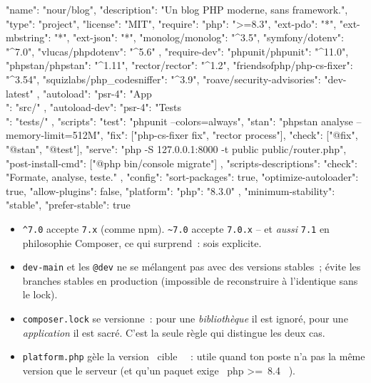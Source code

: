 \begin{codejson}
{
  "name": "nour/blog",
  "description": "Un blog PHP moderne, sans framework.",
  "type": "project",
  "license": "MIT",
  "require": {
    "php": ">=8.3",
    "ext-pdo": "*",
    "ext-mbstring": "*",
    "ext-json": "*",
    "monolog/monolog": "^3.5",
    "symfony/dotenv": "^7.0",
    "vlucas/phpdotenv": "^5.6"
  },
  "require-dev": {
    "phpunit/phpunit": "^11.0",
    "phpstan/phpstan": "^1.11",
    "rector/rector": "^1.2",
    "friendsofphp/php-cs-fixer": "^3.54",
    "squizlabs/php_codesniffer": "^3.9",
    "roave/security-advisories": "dev-latest"
  },
  "autoload": { "psr-4": { "App\\": "src/" } },
  "autoload-dev": { "psr-4": { "Tests\\": "tests/" } },
  "scripts": {
    "test": "phpunit --colors=always",
    "stan": "phpstan analyse --memory-limit=512M",
    "fix": ["php-cs-fixer fix", "rector process"],
    "check": ["@fix", "@stan", "@test"],
    "serve": "php -S 127.0.0.1:8000 -t public public/router.php",
    "post-install-cmd": ["@php bin/console migrate"]
  },
  "scripts-descriptions": { "check": "Formate, analyse, teste." },
  "config": {
    "sort-packages": true,
    "optimize-autoloader": true,
    "allow-plugins": false,
    "platform": { "php": "8.3.0" }
  },
  "minimum-stability": "stable",
  "prefer-stable": true
}
\end{codejson}

\begin{itemize}
  \item \verb|^7.0| accepte \verb|7.x| (comme npm). \verb|~7.0| accepte \verb|7.0.x| -- et
        \emph{aussi} \verb|7.1| en philosophie Composer, ce qui surprend~: sois explicite.
  \item \verb|dev-main| et les \verb|@dev| ne se m\'elangent pas avec des versions stables~; \'evite
        les branches stables en production (impossible de reconstruire \`a l'identique sans le lock).
  \item \texttt{composer.lock} se versionne~: pour une \emph{biblioth\`eque} il est ignor\'e, pour une
        \emph{application} il est sacr\'e. C'est la seule r\`egle qui distingue les deux cas.
  \item \verb|platform.php| g\`ele la version \og ~cible~ \fg{}~: utile quand ton poste n'a pas la m\^eme
        version que le serveur (et qu'un paquet exige \og ~php \textgreater=~8.4~ \fg{}).
\end{itemize}

